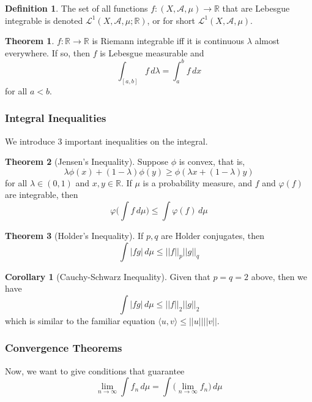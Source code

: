 \documentclass{article}
\theoremstyle{definition}
\newtheorem{theorem}{Theorem}[section]
\newtheorem{corollary}{Corollary}[theorem]
\theoremstyle{remark}
\theoremstyle{definition}
\newtheorem{definition}{Definition}[section]
\begin{document}
\begin{definition}
The set of all functions $f: (X, \mathcal{A}, \mu) \longrightarrow \mathbb{R}$ that are Lebesgue integrable is denoted $\mathcal{L}^1(X, \mathcal{A}, \mu; \mathbb{R})$, or for short $\mathcal{L}^1(X, \mathcal{A}, \mu)$. 
\end{definition}

\begin{theorem}
$f: \mathbb{R} \longrightarrow \mathbb{R}$ is Riemann integrable iff it is continuous $\lambda$ almost everywhere. If so, then $f$ is Lebesgue measurable and 
\[\int_{[a, b]} f \,d\lambda = \int_a^b f \, dx\]
for all $a < b$. 
\end{theorem}

\subsubsection{Integral Inequalities}

We introduce 3 important inequalities on the integral. 

\begin{theorem}[Jensen's Inequality]
Suppose $\phi$ is convex, that is, 
\[\lambda \phi(x) + (1 - \lambda) \phi(y) \geq \phi (\lambda x + (1 - \lambda) y)\]
for all $\lambda \in (0, 1)$ and $x, y \in \mathbb{R}$. If $\mu$ is a probability measure, and $f$ and $\varphi(f)$ are integrable, then 
\[\varphi\bigg( \int f \,d\mu \bigg) \leq \int \varphi(f) \,d\mu\]
\end{theorem}

\begin{theorem}[Holder's Inequality]
If $p, q$ are Holder conjugates, then 
\[\int |f g|\, d\mu \leq ||f||_p ||g||_q\]
\end{theorem}

\begin{corollary}[Cauchy-Schwarz Inequality]
Given that $p = q = 2$ above, then we have 
\[\int |f g|\, d\mu \leq ||f||_2 ||g||_2\]
which is similar to the familiar equation $\langle u, v \rangle \leq ||u|| ||v||$. 
\end{corollary}

\subsubsection{Convergence Theorems}

Now, we want to give conditions that guarantee 
\[\lim_{n \rightarrow \infty} \int f_n \,d \mu = \int \big( \lim_{n \rightarrow \infty} f_n \big) \, d\mu\]
\end{document}
